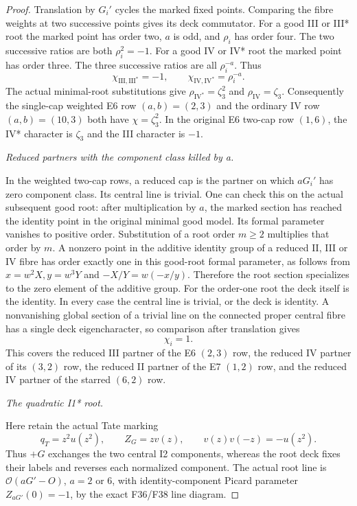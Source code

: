 \begin{proof}
Translation by \(G_i'\) cycles the marked fixed points. Comparing
the fibre weights at two successive points gives its deck
commutator. For a good III or III* root the marked point has order
two, \(a\) is odd, and \(\rho_i\) has order four. The two successive
ratios are both \(\rho_i^2=-1\). For a good IV or IV* root the
marked point has order three. The three successive ratios are
all \(\rho_i^{-a}\). Thus
\[
 \chi_{\mathrm{III},\mathrm{III}^*}=-1,\qquad
 \chi_{\mathrm{IV},\mathrm{IV}^*}=\rho_i^{-a}.           \tag{P3K.35.10}
\]
The actual minimal-root substitutions give
\(\rho_{\mathrm{IV}^*}=\zeta_3^2\) and
\(\rho_{\mathrm{IV}}=\zeta_3\). Consequently the single-cap
weighted E6 row \((a,b)=(2,3)\) and the ordinary IV row
\((a,b)=(10,3)\) both have \(\chi=\zeta_3^2\).
In the original E6 two-cap row \((1,6)\), the IV* character is
\(\zeta_3\) and the III character is \(-1\).

\par\smallskip\noindent\textit{Reduced partners with the component class killed by a.}\enspace

In the weighted two-cap rows, a reduced cap is the partner on
which \(aG_i'\) has zero component class. Its central line is
trivial. One can check this on the actual subsequent good root:
after multiplication by \(a\), the marked section has reached
the identity point in the original minimal good model. Its
formal parameter vanishes to positive order. Substitution of a
root order \(m\ge2\) multiplies that order by \(m\). A nonzero
point in the additive identity group of a reduced II, III or IV
fibre has order exactly one in this good-root formal parameter,
as follows from \(x=w^2X,y=w^3Y\) and
\(-X/Y=w(-x/y)\). Therefore the root section specializes to
the zero element of the additive group. For the order-one root
the deck itself is the identity. In every case the central line
is trivial, or the deck is identity. A nonvanishing global
section of a trivial line on the connected proper central fibre
has a single deck eigencharacter, so comparison after translation
gives
\[
                              \chi_i=1.                 \tag{P3K.35.11}
\]
This covers the reduced III partner of the E6 \((2,3)\) row,
the reduced IV partner of its \((3,2)\) row, the reduced II
partner of the E7 \((1,2)\) row, and the reduced IV partner
of the starred \((6,2)\) row.

\par\smallskip\noindent\textit{The quadratic I1* root.}\enspace

Here retain the actual Tate marking
\[
 q_T=z^2u(z^2),\qquad Z_G=zv(z),\qquad
 v(z)v(-z)=-u(z^2).
\]
Thus \(+G\) exchanges the two central I2 components, whereas
the root deck fixes their labels and reverses each normalized
component. The actual root line is \(\mathcal O(aG'-O)\),
\(a=2\) or \(6\), with identity-component Picard parameter
\(Z_{aG'}(0)=-1\), by the exact F36/F38 line diagram.


\end{proof}

